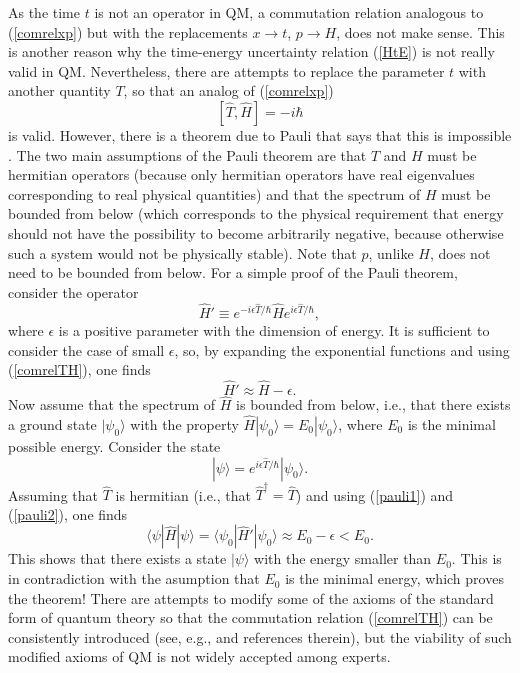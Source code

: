 \documentclass[12pt]{article}
\begin{document}
As the time $t$ is not an operator in QM, a commutation 
relation analogous to (\ref{comrelxp}) but with the replacements
$x\rightarrow t$, $p\rightarrow H$, does not make sense. This is another 
reason why the time-energy uncertainty relation (\ref{HtE}) is not 
really valid in QM. Nevertheless, there are attempts to replace
the parameter $t$ with another quantity $T$, so that an analog of  
(\ref{comrelxp})
\begin{equation}\label{comrelTH}
[\hat{T},\hat{H}]=-i\hbar 
\end{equation}
is valid. However, there is a theorem due to Pauli that says that this is 
impossible \cite{pauli}. The two main assumptions of the Pauli theorem 
are that $T$ and $H$ must be hermitian operators (because only hermitian
operators have real eigenvalues corresponding to real physical 
quantities) and that the spectrum of $H$ must be bounded from 
below (which corresponds to the physical requirement 
that energy should not have the possibility to become arbitrarily negative, 
because otherwise such a system would not be physically stable).
Note that
$p$, unlike $H$, does not need to be bounded from below.
For a simple proof of the Pauli theorem, consider the operator
\begin{equation}\label{pauli1}
\hat{H}'\equiv e^{-i\epsilon\hat{T}/\hbar} \hat{H} 
e^{i\epsilon\hat{T}/\hbar} ,
\end{equation}
where $\epsilon$ is a positive parameter with the dimension of energy.
It is sufficient to consider the case of small $\epsilon$, so, 
by expanding the exponential functions and using (\ref{comrelTH}), 
one finds
\begin{equation}\label{pauli2}
\hat{H}' \approx \hat{H}-\epsilon .
\end{equation}
Now assume that the spectrum of $\hat{H}$ is bounded from below, 
i.e., that there exists a ground state $|\psi_0\rangle$ 
with the property $\hat{H}|\psi_0\rangle=E_0|\psi_0\rangle$, 
where $E_0$ is the minimal possible energy.
Consider the state
\begin{equation}\label{pauli3}
|\psi\rangle=e^{i\epsilon\hat{T}/\hbar}|\psi_0\rangle .
\end{equation}
Assuming that $\hat{T}$ is hermitian (i.e., that
$\hat{T}^{\dagger}=\hat{T}$) and using (\ref{pauli1}) and (\ref{pauli2}),
one finds
\begin{equation}\label{pauli4}
\langle\psi| \hat{H}| \psi\rangle=\langle\psi_0 |\hat{H}'| \psi_0\rangle
\approx E_0-\epsilon < E_0 .
\end{equation}
This shows that there exists a state $|\psi\rangle$ with the energy 
smaller than $E_0$. This is in contradiction with the asumption that 
$E_0$ is the minimal energy, which proves the theorem!  
There are attempts to modify some of the axioms of 
the standard form of quantum theory 
so that the commutation relation (\ref{comrelTH}) can be consistently
introduced (see, e.g., \cite{busch,bostr} and references therein), 
but the viability of such modified axioms of QM is not 
widely accepted among experts. 
\end{document}
